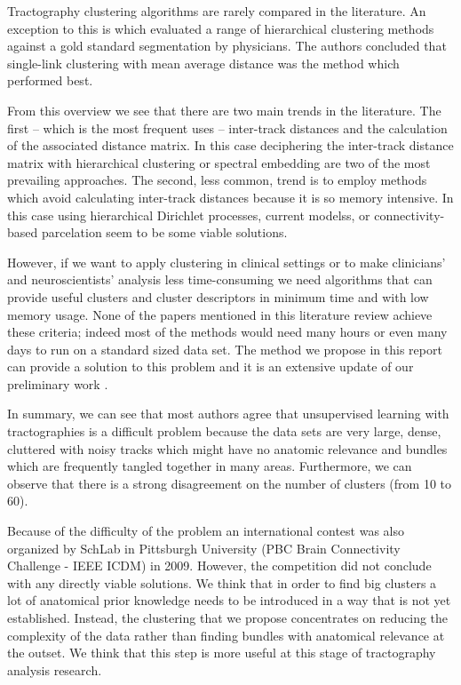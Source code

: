 \documentclass[preprint,authoryear,a4paper,10pt,onecolumn]{elsarticle}
\begin{document}
Tractography clustering algorithms are rarely compared in the
literature. An exception to this is \citep{moberts2005evaluation} which
evaluated a range of hierarchical clustering methods against a gold
standard segmentation by physicians. The authors concluded that
single-link clustering with mean average distance was the method which
performed best.

From this overview we see that there are two main trends in the
literature. The first -- which is the most frequent uses -- inter-track
distances and the calculation of the associated distance matrix. In this
case deciphering the inter-track distance matrix with hierarchical
clustering or spectral embedding are two of the most prevailing
approaches. The second, less common, trend is to employ methods which
avoid calculating inter-track distances because it is so memory
intensive. In this case using hierarchical Dirichlet processes,
current modelss, or connectivity-based parcelation seem to be some viable
solutions.

However, if we want to apply clustering in clinical settings or to make
clinicians' and neuroscientists' analysis less time-consuming we need
algorithms that can provide useful clusters and cluster descriptors in
minimum time and with low memory usage. None of the papers mentioned in
this literature review achieve these criteria; indeed most of the
methods would need many hours or even many days to run on a standard
sized data set. The method we propose in this report can provide a
solution to this problem and it is an extensive update of our
preliminary work \citep{EGMB10}.


In summary, we can see that most authors agree that unsupervised
learning with tractographies is a difficult problem because the data
sets are very large, dense, cluttered with noisy tracks which might have
no anatomic relevance and bundles which are frequently tangled together
in many areas. Furthermore, we can observe that there is a strong
disagreement on the number of clusters (from 10 to 60).

Because of the difficulty of the problem an international contest was
also organized by SchLab in Pittsburgh University (PBC Brain
Connectivity Challenge - IEEE ICDM) in 2009. However, the competition
did not conclude with any directly viable solutions. We think that in
order to find big clusters a lot of anatomical prior knowledge needs to
be introduced in a way that is not yet established. Instead, the
clustering that we propose concentrates on reducing the complexity of
the data rather than finding bundles with anatomical relevance at the
outset. We think that this step is more useful at this stage of
tractography analysis research.
\end{document}
